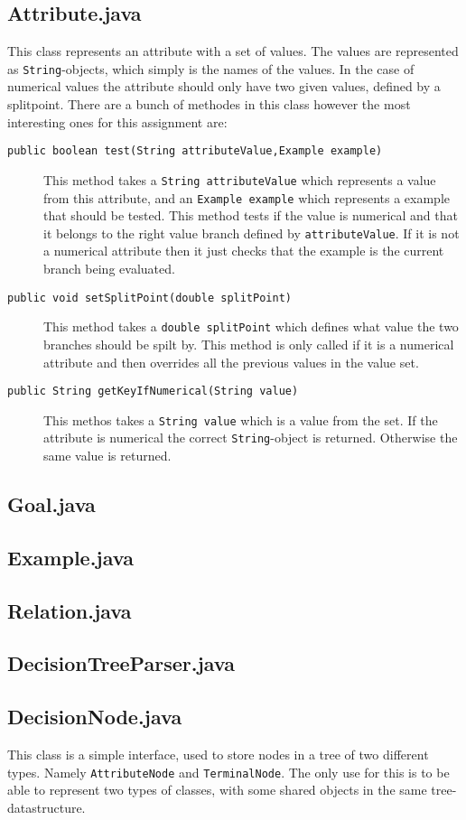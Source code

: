 \documentclass[a4paper]{article}
\begin{document}
\subsection{Attribute.java}
This class represents an attribute with a set of values. The values are represented as \texttt{String}-objects, which simply is the names of the values. In the case of numerical values the attribute should only have two given values, defined by a splitpoint. There are a bunch of methodes in this class however the most interesting ones for this assignment are:
\begin{description}
\item[\texttt{public boolean test(String attributeValue,Example example)}] This method takes a \texttt{String attributeValue} which represents a value from this attribute, and an \texttt{Example example} which represents a example that should be tested. 
This method tests if the value is numerical and that it belongs to the right value branch defined by \texttt{attributeValue}. If it is not a numerical attribute then it just checks that the example is the current branch being evaluated.
\item[\texttt{public void setSplitPoint(double splitPoint)}] This method takes a \texttt{double splitPoint} which defines what value the two branches should be spilt by. This method is only called if it is a numerical attribute and then overrides all the previous values in the value set.
\item[\texttt{public String getKeyIfNumerical(String value)}] This methos takes a \texttt{String value} which is a value from the set. If the attribute is numerical the correct \texttt{String}-object is returned. Otherwise the same value is returned. 
\end{description} 
\subsection{Goal.java}
\subsection{Example.java}
\subsection{Relation.java}
\subsection{DecisionTreeParser.java}
\subsection{DecisionNode.java}
This class is a simple interface, used to store nodes in a tree of two different types. Namely \texttt{AttributeNode} and \texttt{TerminalNode}. The only use for this is to be able to represent two types of classes, with some shared objects in the same tree-datastructure.
\end{document}

